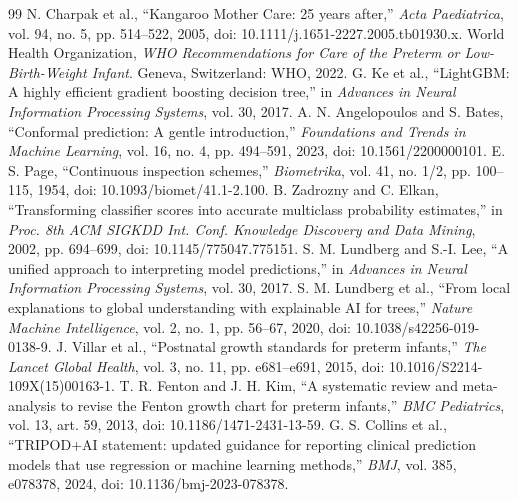 \documentclass[letterpaper,10pt]{article}
\begin{document}
\renewcommand{\refname}{REFERENCIAS}
\begin{thebibliography}{99}
 N. Charpak et al., ``Kangaroo Mother Care: 25 years after,'' \emph{Acta Paediatrica}, vol. 94, no. 5, pp. 514--522, 2005, doi: 10.1111/j.1651-2227.2005.tb01930.x.
 World Health Organization, \emph{WHO Recommendations for Care of the Preterm or Low-Birth-Weight Infant}. Geneva, Switzerland: WHO, 2022.
 G. Ke et al., ``LightGBM: A highly efficient gradient boosting decision tree,'' in \emph{Advances in Neural Information Processing Systems}, vol. 30, 2017.
 A. N. Angelopoulos and S. Bates, ``Conformal prediction: A gentle introduction,'' \emph{Foundations and Trends in Machine Learning}, vol. 16, no. 4, pp. 494--591, 2023, doi: 10.1561/2200000101.
 E. S. Page, ``Continuous inspection schemes,'' \emph{Biometrika}, vol. 41, no. 1/2, pp. 100--115, 1954, doi: 10.1093/biomet/41.1-2.100.
 B. Zadrozny and C. Elkan, ``Transforming classifier scores into accurate multiclass probability estimates,'' in \emph{Proc. 8th ACM SIGKDD Int. Conf. Knowledge Discovery and Data Mining}, 2002, pp. 694--699, doi: 10.1145/775047.775151.
 S. M. Lundberg and S.-I. Lee, ``A unified approach to interpreting model predictions,'' in \emph{Advances in Neural Information Processing Systems}, vol. 30, 2017.
 S. M. Lundberg et al., ``From local explanations to global understanding with explainable AI for trees,'' \emph{Nature Machine Intelligence}, vol. 2, no. 1, pp. 56--67, 2020, doi: 10.1038/s42256-019-0138-9.
 J. Villar et al., ``Postnatal growth standards for preterm infants,'' \emph{The Lancet Global Health}, vol. 3, no. 11, pp. e681--e691, 2015, doi: 10.1016/S2214-109X(15)00163-1.
 T. R. Fenton and J. H. Kim, ``A systematic review and meta-analysis to revise the Fenton growth chart for preterm infants,'' \emph{BMC Pediatrics}, vol. 13, art. 59, 2013, doi: 10.1186/1471-2431-13-59.
 G. S. Collins et al., ``TRIPOD+AI statement: updated guidance for reporting clinical prediction models that use regression or machine learning methods,'' \emph{BMJ}, vol. 385, e078378, 2024, doi: 10.1136/bmj-2023-078378.
\end{thebibliography}
\end{document}
